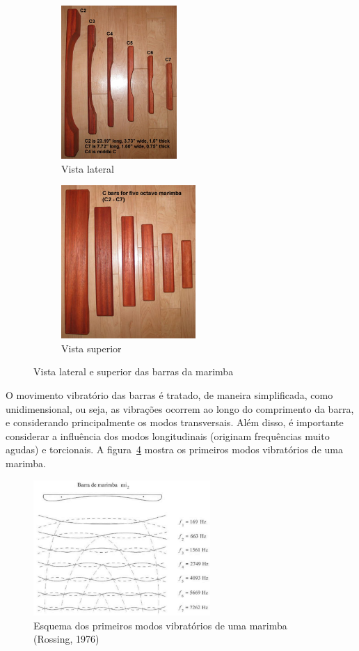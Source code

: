 \documentclass{article}
\begin{document}
\begin{figure}[h!]
	\centering
	\begin{subfigure}{0.45\textwidth}
		\centering
		\includegraphics[height=220px]{marimba_bars.jpg}
		\caption{Vista lateral}
		\label{fig:marimba_bars_side}
	\end{subfigure}
	\hfill
	\begin{subfigure}{0.45\textwidth}
		\centering
		\includegraphics[height=220px]{marimba_bars-top.jpg}
		\caption{Vista superior}
		\label{fig:marimba_bars_top}
	\end{subfigure}
	\caption{Vista lateral e superior das barras da marimba~\cite{lafavre_tuning_marimba}}
	\label{fig:marimba_bars}
\end{figure}

O movimento vibratório das barras é tratado, de maneira simplificada, como unidimensional, ou seja, as vibrações ocorrem ao longo do comprimento da barra, e considerando principalmente os modos transversais. Além disso, é importante considerar a influência dos modos longitudinais (originam frequências muito agudas) e torcionais. A figura~\ref{fig:modos_vibratorios} mostra os primeiros modos vibratórios de uma marimba.

\begin{figure}[h!]
	\centering
	\includegraphics[width=0.6\textwidth]{modos_vibratorios.png}
	\caption{Esquema dos primeiros modos vibratórios de uma marimba (Rossing, 1976)~\cite{henrique2002acústica}}
	\label{fig:modos_vibratorios}
\end{figure}
\end{document}
